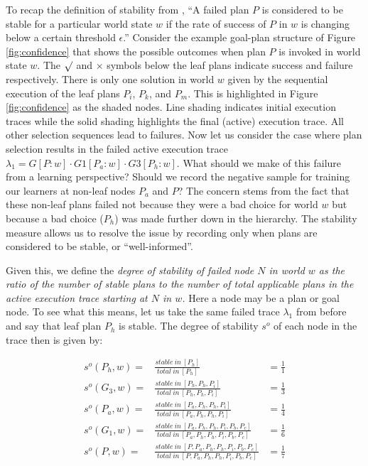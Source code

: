 To recap the definition of stability from \cite{singh10:extending}, ``A failed plan $P$ is considered to be stable for a particular world state $w$ if the rate of success of $P$ in $w$ is changing below a certain threshold $\epsilon$.'' Consider the example goal-plan structure of Figure \ref{fig:confidence} that shows the possible outcomes when plan $P$ is invoked in world state $w$. The $\surd$ and $\times$ symbols below the leaf plans indicate success and failure respectively. There is only one solution in world $w$ given by the sequential execution of the leaf plans $P_i$, $P_k$, and $P_m$. This is highlighted in Figure \ref{fig:confidence} as the shaded nodes. Line shading indicates initial execution traces while the solid shading highlights the final (active) execution trace. All other selection sequences lead to failures. Now let us consider the case where plan selection results in the failed active execution trace $\lambda_1=G[P:w] \cdot G1[P_a:w] \cdot G3[P_h:w]$. What should we make of this failure from a learning perspective? Should we record the negative sample for training our learners at non-leaf nodes $P_a$ and $P$? The concern stems from the fact that these non-leaf plans failed not because they were a bad choice for world $w$ but because a bad choice ($P_h$) was made further down in the hierarchy. The stability measure allows us to resolve the issue by recording only when plans are considered to be stable, or ``well-informed''. 

Given this, we define the {\em degree of stability of failed node $N$ in world $w$ as the ratio of the number of stable plans to the number of total applicable plans in the active execution trace starting at $N$ in $w$.} Here a node may be a plan or goal node. To see what this means, let us take the same failed trace $\lambda_1$ from before and say that leaf plan $P_h$ is stable. The degree of stability $s^o$ of each node in the trace then is given by:

\begin{eqnarray*}
s^o(P_h,w) = & \frac{stable~in~[P_h]}{total~in~[P_h]} & = \frac{1}{1}  \\
s^o(G_3,w) = & \frac{stable~in~[P_h,P_h,P_i]}{total~in~[P_h,P_h,P_i]} & = \frac{1}{3}  \\
s^o(P_a,w) = & \frac{stable~in~[P_a,P_h,P_h,P_i]}{total~in~[P_a,P_h,P_h,P_i]} & = \frac{1}{4} \\
s^o(G_1,w) = & \frac{stable~in~[P_a,P_h,P_h,P_i,P_b,P_c]}{total~in~[P_a,P_h,P_h,P_i,P_b,P_c]} & = \frac{1}{6}  \\
s^o(P,w) = & \frac{stable~in~[P,P_a,P_h,P_h,P_i,P_b,P_c]}{total~in~[P,P_a,P_h,P_h,P_i,P_b,P_c]} & = \frac{1}{7} 
\end{eqnarray*}


